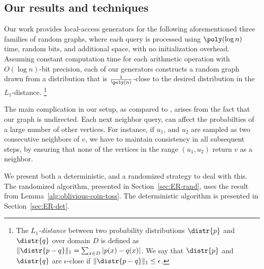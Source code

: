 \subsection{Our results and techniques}


Our work provides local-access generators for the following
aforementioned three families of random graphs, 
where each query is processed using $\poly(\log n)$ 
time, random bits, and additional space, with no initialization overhead. 
Assuming constant computation time for each arithmetic operation with
$O(\log n)$-bit precision, each of our generators constructs a random graph
drawn from a distribution that is $\frac{1}{\poly(n)}$-close
to the desired distribution in the $L_1$-distance.
\footnote{The \emph{$L_1$-distance} between two probability distributions $\distr{p}$ 
and $\distr{q}$ over domain $D$ is defined as $\|\distr{p-q}\|_1 = 
\sum_{x \in D } |p(x)-q(x)|$.
We say that $\distr{p}$ and $\distr{q}$ are $\epsilon$-close if $\|\distr{p-q}\|_1 \leq \epsilon$. 
}

The main complication in our setup, as compared to \cite{reut},
arises from the fact that our graph is undirected.
Each next neighbor query, can affect the probabilties
of a large number of other vertices.
For instance, if $u_1$, and $u_2$ are sampled as two consecutive neighbors of $v$,
we have to maintain consistency in all subsequent steps,
by ensuring that none of the vertices in the range $(u_1,u_2)$
return $v$ as a neighbor.

We present both a deterministic, and a randomized strategy to deal with this.
The randomized algorithm, presented in Section~\ref{sec:ER-rand},
uses the result from Lemma~\ref{alg:oblivious-coin-toss}.
The deterministic algorithm is presented in Section~\ref{sec:ER-det}.


